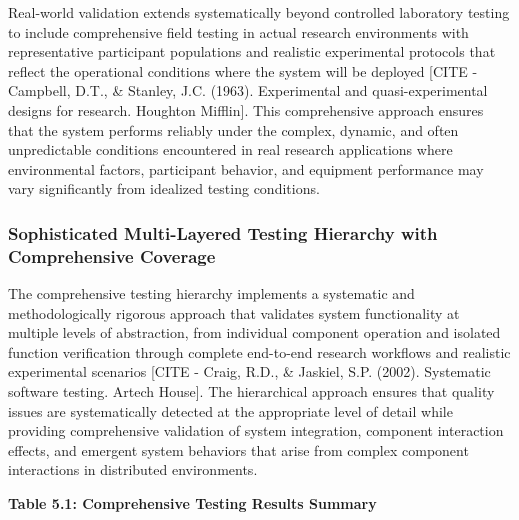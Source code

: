 \documentclass[11pt,a4paper]{report}
\begin{document}
Real-world validation extends systematically beyond controlled laboratory testing to include comprehensive field testing
in actual research environments with representative participant populations and realistic experimental protocols that
reflect the operational conditions where the system will be
deployed [CITE - Campbell, D.T., \& Stanley, J.C. (1963). Experimental and quasi-experimental designs for research. Houghton Mifflin].
This comprehensive approach ensures that the system performs reliably under the complex, dynamic, and often
unpredictable conditions encountered in real research applications where environmental factors, participant behavior,
and equipment performance may vary significantly from idealized testing conditions.

\subsubsection{Sophisticated Multi-Layered Testing Hierarchy with Comprehensive Coverage}

The comprehensive testing hierarchy implements a systematic and methodologically rigorous approach that validates system
functionality at multiple levels of abstraction, from individual component operation and isolated function verification
through complete end-to-end research workflows and realistic experimental
scenarios [CITE - Craig, R.D., \& Jaskiel, S.P. (2002). Systematic software testing. Artech House]. The hierarchical
approach ensures that quality issues are systematically detected at the appropriate level of detail while providing
comprehensive validation of system integration, component interaction effects, and emergent system behaviors that arise
from complex component interactions in distributed environments.

\textbf{Table 5.1: Comprehensive Testing Results Summary}
\end{document}
